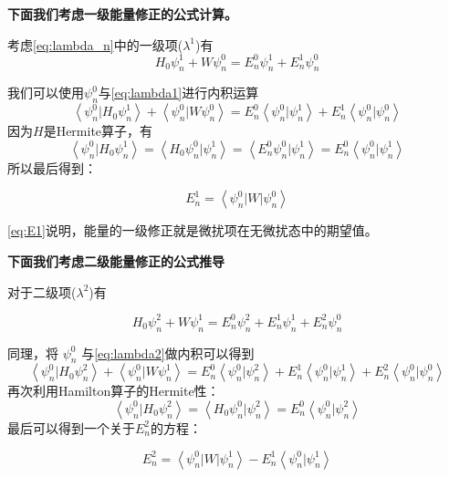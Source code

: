 \textbf{下面我们考虑一级能量修正的公式计算。}

考虑\cref{eq:lambda_n}中的一级项($\lambda ^1$)有
\begin{equation}
	H_0 \psi_n^1 +W \psi_n^0 = E_n^0 \psi_n^1 +E_n^1 \psi_n^0
	\label{eq:lambda1}
\end{equation}

我们可以使用$\psi_n^0$与\cref{eq:lambda1}进行内积运算
$$
\left \langle \psi_n^0 | H_0 \psi_n^1 \right \rangle
+\left \langle \psi_n^0 | W \psi_n^0 \right \rangle  
=
E_n^0 \left \langle \psi_n^0 | \psi_n^1 \right \rangle 
+E_n^1 \left \langle \psi_n^0 | \psi_n^0 \right \rangle 
$$
因为$H$是Hermite算子，有
$$
\left \langle \psi_n^0 | H_0 \psi_n^1 \right \rangle
=\left \langle  H_0 \psi_n^0 | \psi_n^1 \right \rangle
=\left \langle  E^0_n \psi_n^0 | \psi_n^1 \right \rangle
=E^0_n \left \langle   \psi_n^0 | \psi_n^1 \right \rangle
$$
所以最后得到：

\begin{equation}
	E_n^1 = \left \langle \psi_n^0 | W | \psi_n^0  \right \rangle
	\label{eq:E1}
\end{equation}

\cref{eq:E1}说明，能量的一级修正就是微扰项在无微扰态中的期望值。

\textbf{下面我们考虑二级能量修正的公式推导}

对于二级项($\lambda ^2$)有

\begin{equation}
	H_0 \psi _n^2 +W \psi_n^1 = E_n^0 \psi_n^2 +E_n^1 \psi_n^1+E_n^2 \psi_n^0
	\label{eq:lambda2}
\end{equation}

同理，将
$\psi _n^0$ 与\cref{eq:lambda2}做内积可以得到
$$
\left \langle  \psi_n^0 | H_0 \psi_n^2 \right \rangle 
+\left \langle  \psi_n^0 | W \psi_n^1 \right \rangle 
=E_n^0 \left \langle  \psi_n^0 |  \psi_n^2 \right \rangle 
+ E_n^1 \left \langle  \psi_n^0 | \psi_n^1 \right \rangle 
+ E_n^2 \left \langle  \psi_n^0 |  \psi_n^0 \right \rangle 
$$
再次利用Hamilton算子的Hermite性：
$$
\left \langle  \psi_n^0 | H_0 \psi_n^2 \right \rangle
= \left \langle  H_0  \psi_n^0 |\psi_n^2 \right \rangle
=  E_n^0 \left \langle    \psi_n^0 |\psi_n^2 \right \rangle
$$
最后可以得到一个关于$E_n^2$的方程：

\begin{equation}
	E_n^2 = \left \langle \psi_n^0 | W | \psi_n^1 \right \rangle  - E_n^1 \left \langle  \psi_n^0|\psi_n^1 \right \rangle 
	\label{eq:E2}
\end{equation}

